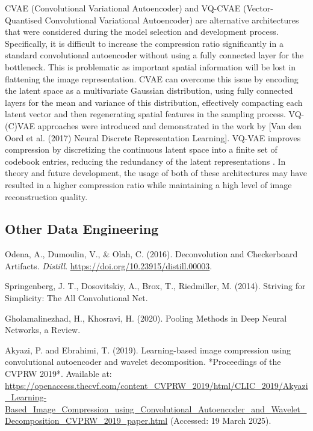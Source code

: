 \documentclass[10pt,twocolumn,letterpaper]{article}
\begin{document}
CVAE (Convolutional Variational Autoencoder) and VQ-CVAE (Vector-Quantised Convolutional Variational Autoencoder) are alternative architectures that were considered during the model selection and development process. Specifically, it is difficult to increase the compression ratio significantly in a standard convolutional autoencoder without using a fully connected layer for the bottleneck. This is problematic as important spatial information will be lost in flattening the image representation. CVAE can overcome this issue by encoding the latent space as a multivariate Gaussian distribution, using fully connected layers for the mean and variance of this distribution, effectively compacting each latent vector and then regenerating spatial features in the sampling process. VQ-(C)VAE approaches were introduced and demonstrated in the work by [Van den Oord et al. (2017) Neural Discrete Representation Learning]. VQ-VAE improves compression by discretizing the continuous latent space into a finite set of codebook entries, reducing the redundancy of the latent representations . In theory and future development, the usage of both of these architectures may have resulted in a higher compression ratio while maintaining a high level of image reconstruction quality.


\subsection{Other Data Engineering}


\begin{thebibliography}{9}

Odena, A., Dumoulin, V., \& Olah, C. (2016). Deconvolution and Checkerboard Artifacts. \textit{Distill}. \href{https://doi.org/10.23915/distill.00003}{https://doi.org/10.23915/distill.00003}.

Springenberg, J. T., Dosovitskiy, A., Brox, T., Riedmiller, M. (2014). Striving for Simplicity: The All Convolutional Net. 

Gholamalinezhad, H., Khosravi, H. (2020). Pooling Methods in Deep Neural Networks, a Review. 

Akyazi, P. and Ebrahimi, T. (2019). Learning-based image compression using convolutional autoencoder and wavelet decomposition. *Proceedings of the CVPRW 2019*. Available at: \url{https://openaccess.thecvf.com/content\_CVPRW\_2019/html/CLIC\_2019/Akyazi\_Learning-Based\_Image\_Compression\_using\_Convolutional\_Autoencoder\_and\_Wavelet\_Decomposition\_CVPRW\_2019\_paper.html} (Accessed: 19 March 2025).

\end{thebibliography}
\end{document}

